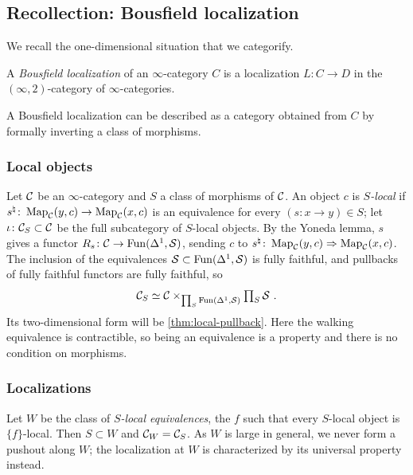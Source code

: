 \subsection{Recollection: Bousfield localization}
\label{subsec:laxloc-bousfield}

%
We recall the one-dimensional situation that we categorify.

\begin{defi}
%
A \emph{Bousfield localization} of an $ \infty $-category $ C $
is a localization $ L: C \to D $ in the $ (\infty,
2) $-category of $ \infty $-categories.
\end{defi}

%
A Bousfield localization can be described as a category obtained from $ C $ by
formally
inverting a class of morphisms.

\subsubsection*{Local objects}
%
Let $\mathcal{C}$ be an $\infty$-category and $S$ a class of morphisms of $\mathcal{C}$.
An object $c$ is \emph{$S$-local} if
$s^{\natural}\colon \operatorname{Map}_{\mathcal{C}}(y,c) \to \operatorname{Map}_{\mathcal{C}}(x,c)$
is an equivalence for every
$(s\colon x \to y) \in S$;
let
$\iota\colon \mathcal{C}_{S} \subset \mathcal{C}$
be the full subcategory of $S$-local objects.
By the Yoneda lemma, $s$ gives a functor
$R_{s}\colon \mathcal{C} \to \operatorname{Fun}(\Delta^{1},\mathcal{S})$,
sending $ c $ to
$s^{\natural}\colon \operatorname{Map}_{\mathcal{C}}(y,c) \Rightarrow \operatorname{Map}_{\mathcal{C}}(x,c)$.
The inclusion of the equivalences
$\mathcal{S} \subset \operatorname{Fun}(\Delta^{1},\mathcal{S})$
is fully faithful, and pullbacks of fully faithful functors are fully faithful,
so
\begin{equation}
\label{eq:bousfield-pullback}
\mathcal{C}_{S} \simeq \mathcal{C} \times_{\prod_{S}\operatorname{Fun}(\Delta^{1},\mathcal{S})}
\textstyle\prod_{S}\mathcal{S} \ .
\end{equation}
Its two-dimensional form will be \cref{thm:local-pullback}.
Here the walking equivalence is contractible,
so being an equivalence is a property and there is no condition on morphisms.

\subsubsection*{Localizations}
%
Let $W$ be the class of \emph{$S$-local equivalences},
the $f$ such that every $S$-local object is $\{f\}$-local.
Then $S \subset W$ and $\mathcal{C}_{W} = \mathcal{C}_{S}$. As $W$ is large in general,
we never form a pushout along $W$; the localization at $W$ is characterized by
its universal property instead.

